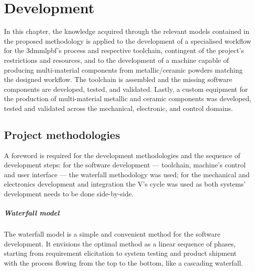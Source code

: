 % 
%
\chapter{Development}%
\label{ch:development}
% 
In this chapter, the knowledge acquired through the relevant models contained
in the proposed methodology is applied to the development of a specialised
workflow for the \gls{3dmmlpbf}'s process and respective toolchain,
contingent of the project's restrictions and resources, and to the development
of a machine capable of producing multi-material components from
metallic/ceramic powders matching the designed workflow. The toolchain is
assembled and the missing software components are developed, tested, and
validated.
Lastly, a custom equipment for the production of
multi-material metallic and ceramic components was developed, tested and
validated across the mechanical, electronic, and control domains.

\section{Project methodologies}%
\label{sec:proj-meth}
A foreword is required for the development methodologies and the sequence of
development steps: for the software development --- toolchain, machine's
control and user interface --- the waterfall methodology was used; for the mechanical and electronics
development and integration the V's cycle was used as both systems' development
needs to be done side-by-side.

\paragraph{Waterfall model}
The waterfall model is a simple and convenient method for the software
development. It
envisions the optimal method
as a linear sequence of phases, starting from requirement elicitation to system
testing and product shipment~\cite{cusumano1995beyond} with the process flowing
from the top to the bottom, like a cascading waterfall.


